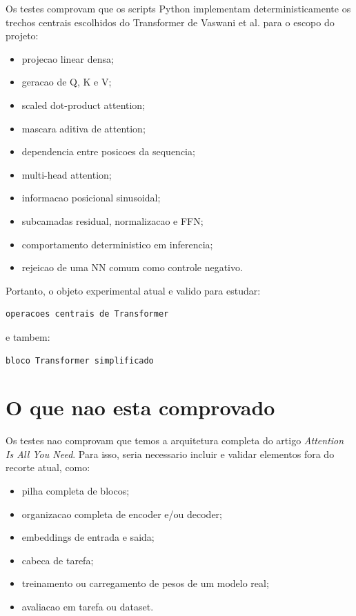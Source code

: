 Os testes comprovam que os scripts Python implementam deterministicamente os trechos centrais escolhidos do Transformer de Vaswani et al. para o escopo do projeto:


\begin{itemize}
\item projecao linear densa;
\item geracao de Q, K e V;
\item scaled dot-product attention;
\item mascara aditiva de attention;
\item dependencia entre posicoes da sequencia;
\item multi-head attention;
\item informacao posicional sinusoidal;
\item subcamadas residual, normalizacao e FFN;
\item comportamento deterministico em inferencia;
\item rejeicao de uma NN comum como controle negativo.
\end{itemize}


Portanto, o objeto experimental atual e valido para estudar:



\begin{Verbatim}[fontsize=\small,breaklines=true,label=text]
operacoes centrais de Transformer
\end{Verbatim}



e tambem:



\begin{Verbatim}[fontsize=\small,breaklines=true,label=text]
bloco Transformer simplificado
\end{Verbatim}



\section{O que nao esta comprovado}





Os testes nao comprovam que temos a arquitetura completa do artigo \emph{Attention Is All You Need}. Para isso, seria necessario incluir e validar elementos fora do recorte atual, como:


\begin{itemize}
\item pilha completa de blocos;
\item organizacao completa de encoder e/ou decoder;
\item embeddings de entrada e saida;
\item cabeca de tarefa;
\item treinamento ou carregamento de pesos de um modelo real;
\item avaliacao em tarefa ou dataset.
\end{itemize}


